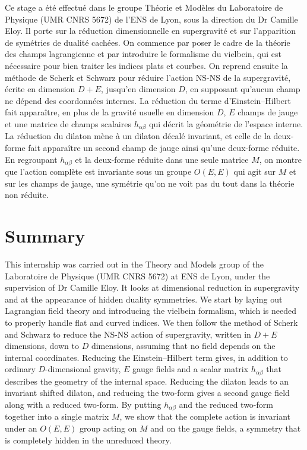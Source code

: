 \documentclass{article}
\begin{document}
Ce stage a été effectué dans le groupe Théorie et Modèles du Laboratoire de Physique (UMR CNRS 5672) de l'ENS de Lyon, sous la direction du Dr Camille Eloy. 
Il porte sur la réduction dimensionnelle en supergravité et sur l'apparition de symétries de dualité cachées. 
On commence par poser le cadre de la théorie des champs lagrangienne et par introduire le formalisme du vielbein, qui est nécessaire pour bien traiter les indices plats et courbes. 
On reprend ensuite la méthode de Scherk et Schwarz pour réduire l'action NS-NS de la supergravité, écrite en dimension $D+E$, jusqu'en dimension $D$, 
en supposant qu'aucun champ ne dépend des coordonnées internes. La réduction du terme d'Einstein--Hilbert fait apparaître, en plus de la gravité usuelle en dimension $D$, 
$E$ champs de jauge et une matrice de champs scalaires $h_{\alpha\beta}$ qui décrit la géométrie de l'espace interne. La réduction du dilaton mène à un dilaton décalé invariant, 
et celle de la deux-forme fait apparaître un second champ de jauge ainsi qu'une deux-forme réduite. En regroupant $h_{\alpha\beta}$ et la deux-forme réduite dans une seule matrice $M$, 
on montre que l'action complète est invariante sous un groupe $O(E,E)$ qui agit sur $M$ et sur les champs de jauge, une symétrie qu'on ne voit pas du tout dans la théorie non réduite.

\section*{Summary}

This internship was carried out in the Theory and Models group of the Laboratoire de Physique (UMR CNRS 5672) at ENS de Lyon, under the supervision of Dr Camille Eloy. It looks at dimensional reduction in supergravity and at the appearance of hidden duality symmetries. 
We start by laying out Lagrangian field theory and introducing the vielbein formalism, which is needed to properly handle flat and curved indices. 
We then follow the method of Scherk and Schwarz to reduce the NS-NS action of supergravity, written in $D+E$ dimensions, down to $D$ dimensions, assuming that no field depends on the internal coordinates. 
Reducing the Einstein--Hilbert term gives, in addition to ordinary $D$-dimensional gravity, $E$ gauge fields and a scalar matrix $h_{\alpha\beta}$ that describes the geometry of the internal space. 
Reducing the dilaton leads to an invariant shifted dilaton, and reducing the two-form gives a second gauge field along with a reduced two-form. By putting $h_{\alpha\beta}$ and the reduced two-form together into a single matrix $M$, we show that the complete action is invariant under an $O(E,E)$ group acting on $M$ and on the gauge fields, a symmetry that is completely hidden in the unreduced theory.
\newpage
\end{document}
